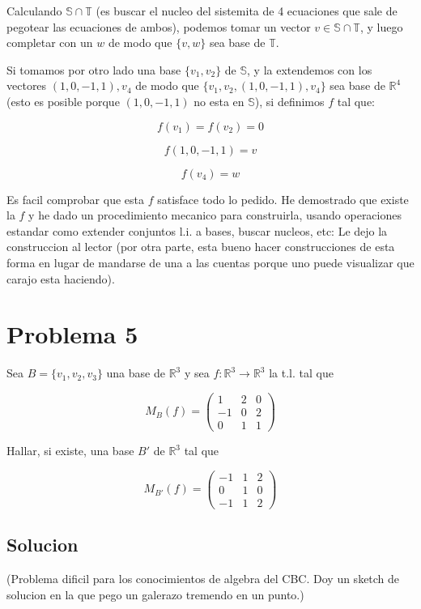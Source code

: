 \documentclass{article}
\begin{document}
Calculando $\mathbb{S} \cap \mathbb{T}$ (es buscar el nucleo del sistemita de 4 ecuaciones que sale de pegotear las ecuaciones
de ambos), podemos tomar un vector $v \in \mathbb{S} \cap \mathbb{T}$, y luego completar con un $w$ de modo que $\{v,w\}$ sea base de $\mathbb{T}$.

Si tomamos por otro lado una base $\{v_1,v_2\}$ de $\mathbb{S}$, y la extendemos con los vectores $(1,0,-1,1),v_4$ de modo que $\{v_1,v_2,(1,0,-1,1),v_4\}$
sea base de $\mathbb{R}^4$ (esto es posible porque $(1,0,-1,1)$ no esta en $\mathbb{S}$), si definimos $f$ tal que:

$$f(v_1) = f(v_2) = 0$$

$$f(1,0,-1,1) = v$$

$$f(v_4) = w$$

Es facil comprobar que esta $f$ satisface todo lo pedido. He demostrado que existe la $f$ y he dado un procedimiento mecanico para construirla,
usando operaciones estandar como extender conjuntos l.i. a bases, buscar nucleos, etc: Le dejo la construccion al lector (por otra parte,
esta bueno hacer construcciones de esta forma en lugar de mandarse de una a las cuentas porque uno puede visualizar que carajo esta haciendo).

\section{Problema 5}

Sea $B = \{v_1,v_2,v_3\}$ una base de $\mathbb{R}^3$ y sea $f : \mathbb{R}^3 \rightarrow \mathbb{R}^3$ la t.l. tal que

$$M_B(f) = \begin{pmatrix} 1 & 2 & 0 \\ -1 & 0 & 2 \\ 0 & 1 & 1 \end{pmatrix}$$

Hallar, si existe, una base $B'$ de $\mathbb{R}^3$ tal que

$$M_{B'}(f) = \begin{pmatrix} -1 & 1 & 2 \\ 0 & 1 & 0 \\ -1 & 1 & 2 \end{pmatrix}$$

\subsection{Solucion}

(Problema dificil para los conocimientos de algebra del CBC. Doy un sketch de solucion en la que pego un galerazo tremendo en un punto.)
\end{document}
